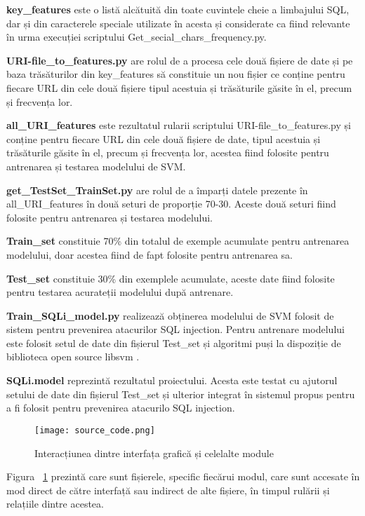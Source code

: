 \textbf{key\_features} este  o listă alcătuită din toate cuvintele cheie a limbajului SQL, dar și din caracterele speciale utilizate în acesta și considerate ca fiind relevante în urma execuției scriptului  Get\_secial\_chars\_frequency.py.

\textbf{URI-file\_to\_features.py}  are rolul de a procesa cele două fișiere de date și pe baza trăsăturilor din  key\_features  să constituie un nou fișier ce conține pentru fiecare URL din cele două fișiere tipul acestuia și trăsăturile găsite în el, precum și frecvența lor.

\textbf{all\_URI\_features} este rezultatul rularii scriptului URI-file\_to\_features.py  și conține pentru fiecare URL din cele două fișiere de date, tipul acestuia și trăsăturile găsite în el, precum și frecvența lor, acestea fiind folosite pentru antrenarea și testarea modelului de SVM. 

\textbf{get\_TestSet\_TrainSet.py}  are rolul de a împarți datele prezente în  all\_URI\_features  în două seturi de proporție 70-30. Aceste două seturi fiind folosite pentru antrenarea și testarea modelului. 

\textbf{Train\_set} constituie 70\% din totalul de exemple acumulate pentru antrenarea modelului, doar acestea fiind de fapt folosite pentru antrenarea sa. 

\textbf{Test\_set} constituie 30\%  din exemplele acumulate, aceste date fiind folosite pentru testarea acurateții modelului după antrenare. 

\textbf{Train\_SQLi\_model.py} realizează obținerea modelului de SVM folosit de sistem pentru prevenirea atacurilor SQL injection. Pentru antrenare modelului este folosit setul de date din fișierul Test\_set și algoritmi puși la dispoziție de biblioteca open source libsvm  \cite{libsvm}.

\textbf{SQLi.model}  reprezintă rezultatul proiectului. Acesta este testat cu ajutorul setului de date din fișierul Test\_set și ulterior integrat în sistemul propus pentru a fi folosit pentru prevenirea atacurilo SQL injection. 

\newpage

\begin{figure}[h]
	\centering
	\texttt{[image: source\_code.png]}
	\caption{ Interacțiunea dintre interfața grafică și celelalte module }
	\label{fig:source_code}
\end{figure}
Figura ~\ref{fig:source_code}  prezintă care sunt fișierele, specific fiecărui modul, care sunt accesate în mod direct de către interfață sau indirect de alte fișiere, în timpul rulării și relațiile dintre acestea. \\


